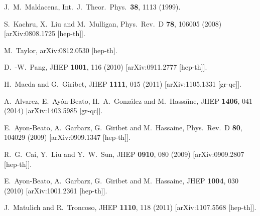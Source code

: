 \documentclass[prd,twocolumn,superscriptaddress,amsmath,amssymb,nofootinbib]{revtex4-1}
\begin{document}
\begin{thebibliography}{99}

  J.~M.~Maldacena,
  Int.\ J.\ Theor.\ Phys.\  {\bf 38}, 1113 (1999).

  S.~Kachru, X.~Liu and M.~Mulligan,
  Phys.\ Rev.\ D {\bf 78}, 106005 (2008)
  [arXiv:0808.1725 [hep-th]].

  M.~Taylor,
  arXiv:0812.0530 [hep-th].

  D.~-W.~Pang,
  JHEP {\bf 1001}, 116 (2010)
  [arXiv:0911.2777 [hep-th]].

  H.~Maeda and G.~Giribet,
  JHEP {\bf 1111}, 015 (2011)
  [arXiv:1105.1331 [gr-qc]].

  A.~Alvarez, E.~Ay\'{o}n-Beato, H.~A.~Gonz\'{a}lez and M.~Hassa\"{\i}ne,
  JHEP {\bf 1406}, 041 (2014)
  [arXiv:1403.5985 [gr-qc]].

  E.~Ayon-Beato, A.~Garbarz, G.~Giribet and M.~Hassaine,
  Phys.\ Rev.\ D {\bf 80}, 104029 (2009)
  [arXiv:0909.1347 [hep-th]].

  R.~G.~Cai, Y.~Liu and Y.~W.~Sun,
  JHEP {\bf 0910}, 080 (2009)
  [arXiv:0909.2807 [hep-th]].

  E.~Ayon-Beato, A.~Garbarz, G.~Giribet and M.~Hassaine,
  JHEP {\bf 1004}, 030 (2010)
  [arXiv:1001.2361 [hep-th]].

  J.~Matulich and R.~Troncoso,
  JHEP {\bf 1110}, 118 (2011)
  [arXiv:1107.5568 [hep-th]].


\end{thebibliography}
\end{document}
